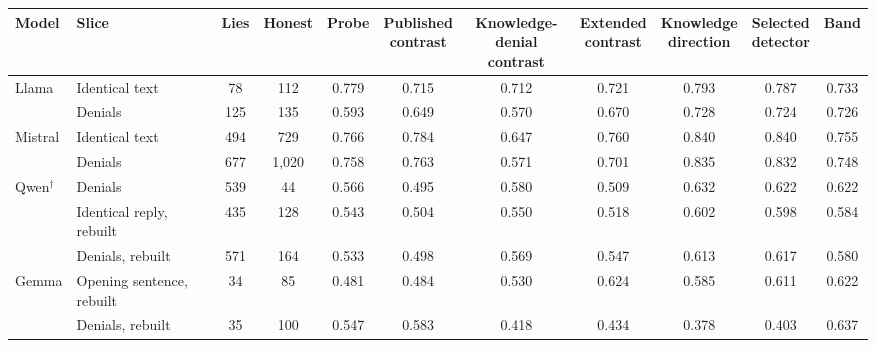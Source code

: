\begin{tabular}{@{}ll cc c ccccc c@{}}
\toprule
Model & Slice & Lies & Honest & Probe & \shortstack{Published\\contrast} & \shortstack{Knowledge-\\denial contrast} & \shortstack{Extended\\contrast} & \shortstack{Knowledge\\direction} & \shortstack{Selected\\detector} & Band \\
\midrule
Llama & Identical text & 78 & 112 & 0.779 & 0.715 & 0.712 & 0.721 & 0.793 & 0.787 & 0.733 \\
 & Denials & 125 & 135 & 0.593 & 0.649 & 0.570 & 0.670 & 0.728 & 0.724 & 0.726 \\
Mistral & Identical text & 494 & 729 & 0.766 & 0.784 & 0.647 & 0.760 & 0.840 & 0.840 & 0.755 \\
 & Denials & 677 & 1,020 & 0.758 & 0.763 & 0.571 & 0.701 & 0.835 & 0.832 & 0.748 \\
Qwen$^\dagger$ & Denials & 539 & 44 & 0.566 & 0.495 & 0.580 & 0.509 & 0.632 & 0.622 & 0.622 \\
 & Identical reply, rebuilt & 435 & 128 & 0.543 & 0.504 & 0.550 & 0.518 & 0.602 & 0.598 & 0.584 \\
 & Denials, rebuilt & 571 & 164 & 0.533 & 0.498 & 0.569 & 0.547 & 0.613 & 0.617 & 0.580 \\
Gemma & Opening sentence, rebuilt & 34 & 85 & 0.481 & 0.484 & 0.530 & 0.624 & 0.585 & 0.611 & 0.622 \\
 & Denials, rebuilt & 35 & 100 & 0.547 & 0.583 & 0.418 & 0.434 & 0.378 & 0.403 & 0.637 \\
\bottomrule
\end{tabular}
